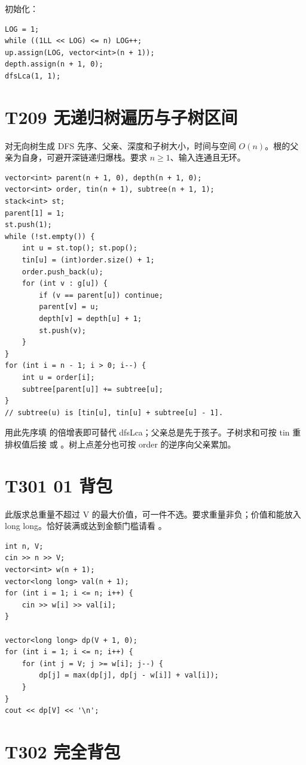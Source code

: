 初始化：

\begin{lstlisting}
LOG = 1;
while ((1LL << LOG) <= n) LOG++;
up.assign(LOG, vector<int>(n + 1));
depth.assign(n + 1, 0);
dfsLca(1, 1);
\end{lstlisting}

\section{T209 无递归树遍历与子树区间}\label{sec:09-23}\label{tpl:209}
对无向树生成 DFS 先序、父亲、深度和子树大小，时间与空间 $O(n)$。根的父亲为自身，可避开深链递归爆栈。要求 $n\ge1$、输入连通且无环。
\begin{lstlisting}
vector<int> parent(n + 1, 0), depth(n + 1, 0);
vector<int> order, tin(n + 1), subtree(n + 1, 1);
stack<int> st;
parent[1] = 1;
st.push(1);
while (!st.empty()) {
    int u = st.top(); st.pop();
    tin[u] = (int)order.size() + 1;
    order.push_back(u);
    for (int v : g[u]) {
        if (v == parent[u]) continue;
        parent[v] = u;
        depth[v] = depth[u] + 1;
        st.push(v);
    }
}
for (int i = n - 1; i > 0; i--) {
    int u = order[i];
    subtree[parent[u]] += subtree[u];
}
// subtree(u) is [tin[u], tin[u] + subtree[u] - 1].
\end{lstlisting}
用此先序填  的倍增表即可替代 dfsLca；父亲总是先于孩子。子树求和可按 tin 重排权值后接  或 。树上点差分也可按 order 的逆序向父亲累加。

\section{T301 01 背包}\label{sec:09-24}\label{tpl:301}

此版求总重量不超过 V 的最大价值，可一件不选。要求重量非负；价值和能放入 long long。恰好装满或达到金额门槛请看 。

\begin{lstlisting}
int n, V;
cin >> n >> V;
vector<int> w(n + 1);
vector<long long> val(n + 1);
for (int i = 1; i <= n; i++) {
    cin >> w[i] >> val[i];
}

vector<long long> dp(V + 1, 0);
for (int i = 1; i <= n; i++) {
    for (int j = V; j >= w[i]; j--) {
        dp[j] = max(dp[j], dp[j - w[i]] + val[i]);
    }
}
cout << dp[V] << '\n';
\end{lstlisting}


\section{T302 完全背包}\label{sec:09-25}\label{tpl:302}

